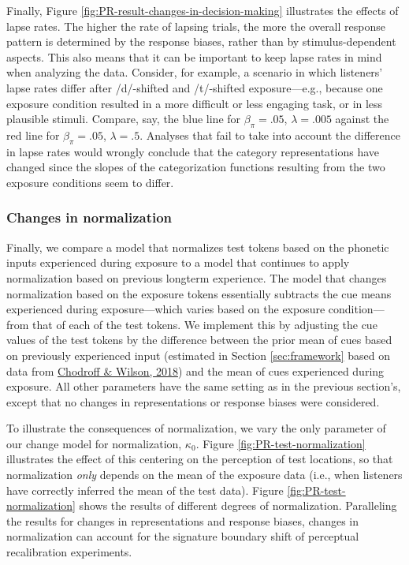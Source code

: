 \documentclass[
  11pt,
  english,
  man,floatsintext]{apa6}
\begin{document}
Finally, Figure \ref{fig:PR-result-changes-in-decision-making} illustrates the effects of lapse rates. The higher the rate of lapsing trials, the more the overall response pattern is determined by the response biases, rather than by stimulus-dependent aspects. This also means that it can be important to keep lapse rates in mind when analyzing the data. Consider, for example, a scenario in which listeners' lapse rates differ after /d/-shifted and /t/-shifted exposure---e.g., because one exposure condition resulted in a more difficult or less engaging task, or in less plausible stimuli. Compare, say, the blue line for \(\beta_{\pi} = .05\), \(\lambda = .005\) against the red line for \(\beta_{\pi} = .05\), \(\lambda = .5\). Analyses that fail to take into account the difference in lapse rates would wrongly conclude that the category representations have changed since the slopes of the categorization functions resulting from the two exposure conditions seem to differ.

\hypertarget{changes-in-normalization}{%
\subsubsection{Changes in normalization}\label{changes-in-normalization}}

Finally, we compare a model that normalizes test tokens based on the phonetic inputs experienced during exposure to a model that continues to apply normalization based on previous longterm experience. The model that changes normalization based on the exposure tokens essentially subtracts the cue means experienced during exposure---which varies based on the exposure condition---from that of each of the test tokens. We implement this by adjusting the cue values of the test tokens by the difference between the prior mean of cues based on previously experienced input (estimated in Section \ref{sec:framework} based on data from \protect\hyperlink{ref-chodroff-wilson2018}{Chodroff \& Wilson, 2018}) and the mean of cues experienced during exposure. All other parameters have the same setting as in the previous section's, except that no changes in representations or response biases were considered.

To illustrate the consequences of normalization, we vary the only parameter of our change model for normalization, \(\kappa_0\). Figure \ref{fig:PR-test-normalization} illustrates the effect of this centering on the perception of test locations, so that normalization \emph{only} depends on the mean of the exposure data (i.e., when listeners have correctly inferred the mean of the test data). Figure \ref{fig:PR-test-normalization} shows the results of different degrees of normalization. Paralleling the results for changes in representations and response biases, changes in normalization can account for the signature boundary shift of perceptual recalibration experiments.
\end{document}
